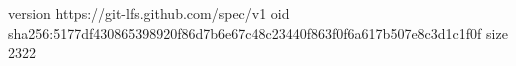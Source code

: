 version https://git-lfs.github.com/spec/v1
oid sha256:5177df430865398920f86d7b6e67c48c23440f863f0f6a617b507e8c3d1c1f0f
size 2322
